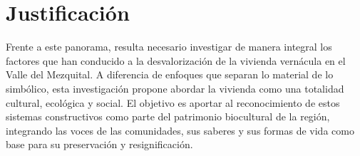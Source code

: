 \section{Justificación}

Frente a este panorama, resulta necesario investigar de manera integral los factores que han conducido a la desvalorización de la vivienda vernácula en el Valle del Mezquital. A diferencia de enfoques que separan lo material de lo simbólico, esta investigación propone abordar la vivienda como una totalidad cultural, ecológica y social. El objetivo es aportar al reconocimiento de estos sistemas constructivos como parte del patrimonio biocultural de la región, integrando las voces de las comunidades, sus saberes y sus formas de vida como base para su preservación y resignificación.
